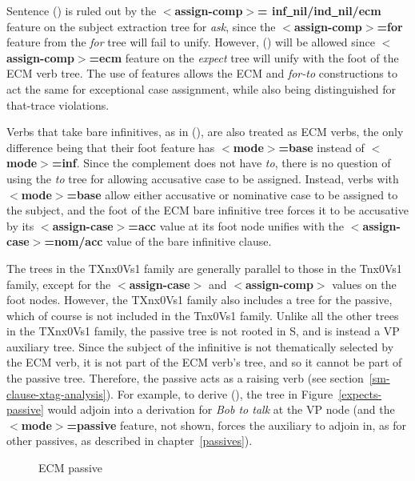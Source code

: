 Sentence () is ruled out by the {\bf $<$assign-comp$>$=
inf\underline{~}nil/ind\underline{~}nil/ecm} feature
on the subject extraction tree for {\it ask}, since the
{\bf $<$assign-comp$>$=for} feature from the {\it for} tree will fail to 
unify.  However, 
() will be allowed since {\bf $<$assign-comp$>$=ecm} feature on the
{\it expect} tree will unify with the foot of the ECM verb tree.  
The use of features allows the ECM and
{\it for-to\/} constructions to act the same for exceptional case assignment,
while also being distinguished for that-trace violations.

Verbs that take bare infinitives, as in (), are 
also treated as ECM verbs,
the only difference being that their foot feature has
{\bf $<$mode$>$=base} instead of {\bf $<$mode$>$=inf}.  Since the complement
does not have {\it to}, there is no question of using the {\it to} tree
for allowing accusative case to be assigned.  Instead, verbs with
{\bf $<$mode$>$=base} allow either accusative or nominative case to be 
assigned to the subject, and the foot of the ECM bare infinitive tree 
forces it to be accusative by its {\bf $<$assign-case$>$=acc} value at its
foot node unifies with the {\bf $<$assign-case$>$=nom/acc} value of the 
bare infinitive clause.


The trees in the TXnx0Vs1 family are generally parallel to those in the
Tnx0Vs1 family, except for the {\bf $<$assign-case$>$} and
{\bf $<$assign-comp$>$} values on the foot nodes.  However, the TXnx0Vs1
family also includes a tree for the passive, which of course is not
included in the Tnx0Vs1 family.  Unlike all the other trees in the 
TXnx0Vs1 family, the passive tree is not rooted in S, and is instead a 
VP auxiliary tree.  Since the
subject of the infinitive is not thematically selected by the ECM verb,
it is not part of the ECM verb's tree, and so it cannot be part of the
passive tree.   Therefore, the passive acts as a raising verb (see 
section~\ref{sm-clause-xtag-analysis}).
For example, to derive (), the tree in Figure~\ref{expects-passive}
would adjoin into a 
derivation for {\it Bob to talk} at the VP node  (and the 
{\bf $<$mode$>$=passive} feature, not shown, forces the auxiliary to
adjoin in, as for other passives, as described in chapter~\ref{passives}).


\begin{figure}[hbt]
\centering
\hspace{0.0in}
\caption{ECM passive}
\label{expects-passive}
\label{3;2,15}
\end{figure}

